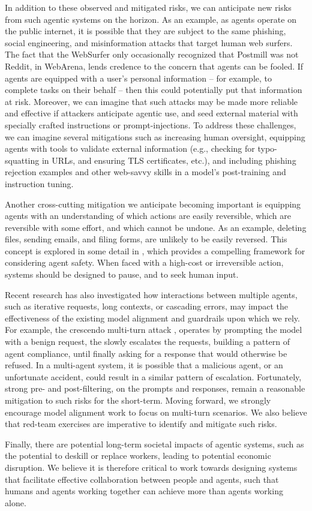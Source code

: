 In addition to these observed and mitigated risks, we can anticipate new risks from such agentic systems on the horizon. As an example, as agents operate on the public internet, it is possible that they are subject to the same phishing, social engineering, and misinformation attacks that target human web surfers. The fact that the WebSurfer only occasionally recognized that Postmill was not Reddit, in WebArena, lends credence to the concern that agents can be fooled. If agents are equipped with a user's personal information  -- for example, to complete tasks on their behalf --  then this could potentially put that information at risk. Moreover, we can imagine that such attacks may be made more reliable and effective if attackers anticipate agentic use, and seed external material with specially crafted instructions or prompt-injections. To address these challenges, we can imagine several mitigations such as increasing human oversight, equipping agents with tools to validate external information (e.g., checking for typo-squatting in URLs, and ensuring TLS certificates, etc.), and including phishing rejection examples and other web-savvy skills in a model's post-training and instruction tuning. 

Another cross-cutting mitigation we anticipate becoming important is equipping agents with an understanding of which actions are easily reversible, which are reversible with some effort, and which cannot be undone. As an example, deleting files, sending emails, and filing forms, are unlikely to be easily reversed. This concept is explored in some detail in \cite{zhang2024interaction}, which provides a compelling framework for considering agent safety. When faced with a high-cost or irreversible action, systems should be designed to pause, and to seek human input.

Recent research has also investigated how interactions between multiple agents, such as iterative requests, long contexts, or cascading errors, may impact the effectiveness of the existing model alignment and guardrails upon which we rely. For example, the crescendo multi-turn attack \cite{russinovich2024great}, operates by prompting the model with a benign request, the slowly escalates the requests, building a pattern of agent compliance, until finally asking for a response that would otherwise be refused. In a multi-agent system, it is possible that a malicious agent, or an unfortunate accident, could result in a similar pattern of escalation. Fortunately, strong pre- and post-filtering, on the prompts and responses, remain a reasonable mitigation to such risks for the short-term. Moving forward, we strongly encourage model alignment work to focus on multi-turn scenarios. We also believe that red-team exercises are imperative to identify and mitigate such risks. 

Finally, there are potential long-term societal impacts of agentic systems, such as the potential to deskill or replace workers, leading to potential economic disruption. We believe it is therefore critical to work towards designing systems that facilitate effective collaboration between people and agents, such that humans and agents working together can achieve more than agents working alone. 
